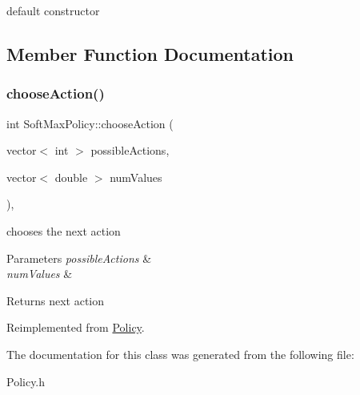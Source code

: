 default constructor 

\subsection{Member Function Documentation}
\mbox{\label{class_soft_max_policy_a425d8bb5f2f504f2d7de8576f0e3f81f}} 
\subsubsection{\texorpdfstring{choose\+Action()}{chooseAction()}}
{\footnotesize\ttfamily int Soft\+Max\+Policy\+::choose\+Action (\begin{DoxyParamCaption}\item[{vector$<$ int $>$}]{possible\+Actions,  }\item[{vector$<$ double $>$}]{num\+Values }\end{DoxyParamCaption})\hspace{0.3cm}{\ttfamily [inline]}, {\ttfamily [virtual]}}

chooses the next action 
\begin{DoxyParams}{Parameters}
{\em possible\+Actions} & \\
\hline
{\em num\+Values} & \\
\hline
\end{DoxyParams}
\begin{DoxyReturn}{Returns}
next action 
\end{DoxyReturn}


Reimplemented from \mbox{\hyperlink{class_policy_a7afb2eee3c77b96a58d992acb4e0e1a8}{Policy}}.



The documentation for this class was generated from the following file\+:\begin{DoxyCompactItemize}
\item 
Policy.\+h\end{DoxyCompactItemize}

